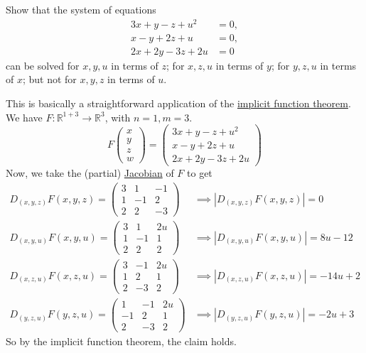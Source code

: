 	\begin{exercise}[Rudin 9.19]
		Show that the system of equations
		\begin{align}
			3x+y-z+u^2 &= 0, \\
			x-y+2z+u &= 0, \\
			2x+2y-3z+2u &= 0
		\end{align}
		can be solved for $x,y,u$ in terms of $z$; for $x,z,u$ in terms of $y$; for $y,z,u$ in terms of $x$; but not for $x,y,z$ in terms of $u$.
	\end{exercise}
	\begin{solution}
		This is basically a straightforward application of the \hyperref[thm:implicit-function-theorem]{implicit function theorem}. We have $F: \mathbb{R}^{1 + 3} \to \mathbb{R}^3$, with $n = 1, m = 3$. 
		\begin{equation}
			F\begin{pmatrix} x \\ y \\ z \\ w \end{pmatrix} = \begin{pmatrix} 
				3x + y - z + u^2 \\ 
				x - y + 2z + u \\ 
				2x + 2y - 3z + 2u 
			\end{pmatrix}
		\end{equation}
		Now, we take the (partial) \hyperref[def:jacobian]{Jacobian} of $F$ to get
		\begin{align}
			D_{(x, y, z)} F(x, y, z) = \begin{pmatrix} 
				3 & 1 & -1 \\ 
				1 & -1 & 2 \\ 
				2 & 2 & -3 
			\end{pmatrix} & \implies |D_{(x, y, z)} F(x, y, z)| = 0 \\ 
			D_{(x, y, u)} F(x, y, u) = \begin{pmatrix} 
				3 & 1 & 2u \\ 
				1 & -1 & 1 \\ 
				2 & 2 & 2
			\end{pmatrix} & \implies |D_{(x, y, u)} F(x, y, u)| = 8u - 12 \\ 
			D_{(x, z, u)} F(x, z, u) = \begin{pmatrix} 
				3 & -1 & 2u \\ 
				1 & 2 & 1 \\ 
				2 & -3 & 2 
			\end{pmatrix} & \implies |D_{(x, z, u)} F(x, z, u)| = -14 u + 2 \\  
			D_{(y, z, u)} F(y, z, u) = \begin{pmatrix} 
				1 & -1 & 2u \\ 
				-1 & 2 & 1 \\ 
				2 & -3 & 2 
			\end{pmatrix} & \implies |D_{(y, z, u)} F(y, z, u)| = -2u + 3
		\end{align}
		So by the implicit function theorem, the claim holds. 
	\end{solution}

